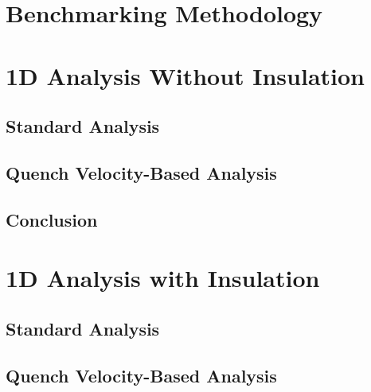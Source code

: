 \documentclass[11pt,a4paper]{report}
\begin{document}
\section{Benchmarking Methodology}
\label{section:quench_velocity_benchmarking_benchmarking_methodology}


\section{1D Analysis Without Insulation}
\label{section:quench_velocity_benchmarking_no_insulation}

\subsection{Standard Analysis}
\label{section:quench_velocity_benchmarking_no_insulation_heat_balance}


\subsection{Quench Velocity-Based Analysis}
\label{section:quench_velocity_benchmarking_no_insulation_quench_velocity}


\subsection{Conclusion}


\section{1D Analysis with Insulation}
\label{section:quench_velocity_benchmarking_with_insulation}

\subsection{Standard Analysis}
\label{section:quench_velocity_benchmarking_with_insulation_heat_balance}


\subsection{Quench Velocity-Based Analysis}
\label{section:quench_velocity_benchmarking_with_insulation_quench_velocity}

\end{document}
